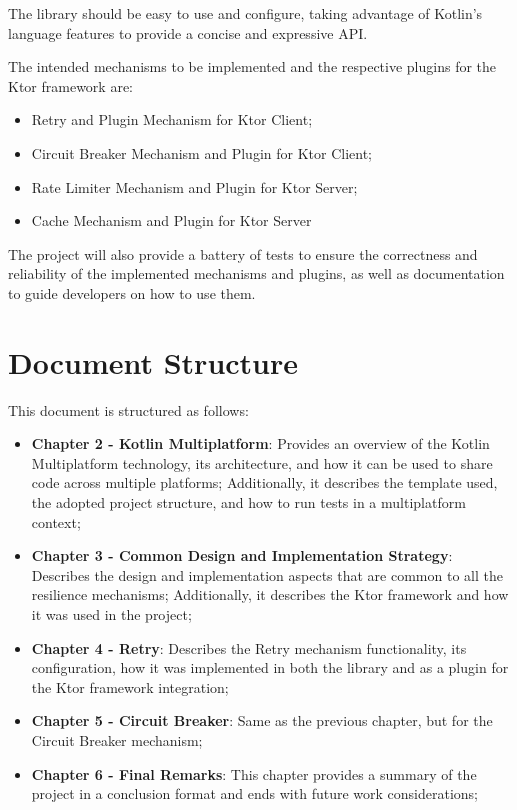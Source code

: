 The library should be easy to use and configure, taking advantage of Kotlin's language features to provide a concise and expressive API.

The intended mechanisms to be implemented and the respective plugins for the Ktor framework are:

\begin{itemize}
    \item Retry and Plugin Mechanism for Ktor Client;
    \item Circuit Breaker Mechanism and Plugin for Ktor Client;
    \item Rate Limiter Mechanism and Plugin for Ktor Server;
    \item Cache Mechanism and Plugin for Ktor Server
\end{itemize}

The project will also provide a battery of tests
to ensure the correctness and reliability of the implemented mechanisms and plugins,
as well as documentation to guide developers on how to use them.

\section{Document Structure}\label{sec:document-structure}

This document is structured as follows:

\begin{itemize}
    \item \textbf{Chapter 2 - Kotlin Multiplatform}: Provides an overview of the Kotlin Multiplatform technology, its architecture, and how it can be used to share code across multiple platforms; Additionally, it describes the template used, the adopted project structure, and how to run tests in a multiplatform context;
    \item \textbf{Chapter 3 - Common Design and Implementation Strategy}: Describes the design and implementation aspects that are common to all the resilience mechanisms; Additionally, it describes the Ktor framework and how it was used in the project;
    \item \textbf{Chapter 4 - Retry}: Describes the Retry mechanism functionality, its configuration, how it was implemented in both the library and as a plugin for the Ktor framework integration;
    \item \textbf{Chapter 5 - Circuit Breaker}: Same as the previous chapter, but for the Circuit Breaker mechanism;
    \item \textbf{Chapter 6 - Final Remarks}: This chapter provides a summary of the project in a conclusion format and ends with future work considerations;
\end{itemize}

